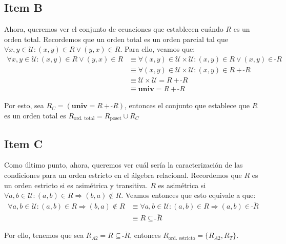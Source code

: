 \documentclass{article}
\newcommand{\U}{\mathcal{U}}
\newcommand{\univ}{\textbf{univ}}
\newcommand{\conv}[1]{\ \tilde{}#1}
\begin{document}
\subsection*{Item B}
Ahora, queremos ver el conjunto de ecuaciones que establecen cuándo $R$ es un orden total.
Recordemos que un orden total es un orden parcial tal que $\forall x, y \in \U : (x, y) \in R \lor (y, x) \in R$.
Para ello, veamos que:
\begin{equation*}
  \begin{aligned}
    \forall x, y \in \U : (x, y) \in R \lor (y, x) \in R &\equiv \forall (x, y) \in \U \times \U : (x, y) \in R \lor (x, y) \in \conv{R} \\ 
                                                         &\equiv \forall (x, y) \in \U \times \U : (x, y) \in R + \conv{R} \\ 
                                                         &\equiv \U \times \U = R + \conv{R} \\ 
                                                         &\equiv \univ = R + \conv{R}
  \end{aligned}
\end{equation*}

Por esto, sea $R_C = (\univ = R + \conv{R})$, entonces el conjunto que establece que $R$ es un orden total es $R_\text{ord. total} = R_\text{poset} \cup R_C$

\subsection*{Item C}
Como último punto, ahora, queremos ver cuál sería la caracterización de las condiciones para un orden estricto en el álgebra relacional.
Recordemos que $R$ es un orden estricto si es asimétrica y transitiva.
$R$ es asimétrica si $\forall a, b \in \U : (a, b) \in R \Rightarrow (b, a) \notin R$.
Veamos entonces que esto equivale a que:
\begin{equation*}
  \begin{aligned}
    \forall a, b \in \U : (a, b) \in R \Rightarrow (b, a) \notin R &\equiv \forall a, b \in \U : (a, b) \in R \Rightarrow (a, b) \in \overline{\conv{R}} \\ 
                                                                   &\equiv R \subseteq \overline{\conv{R}}
  \end{aligned}
\end{equation*}

Por ello, tenemos que sea $R_{A2} = R \subseteq \overline{\conv{R}}$, entonces $R_\text{ord. estricto} = \{R_{A2}, R_T\}$.
\end{document}
